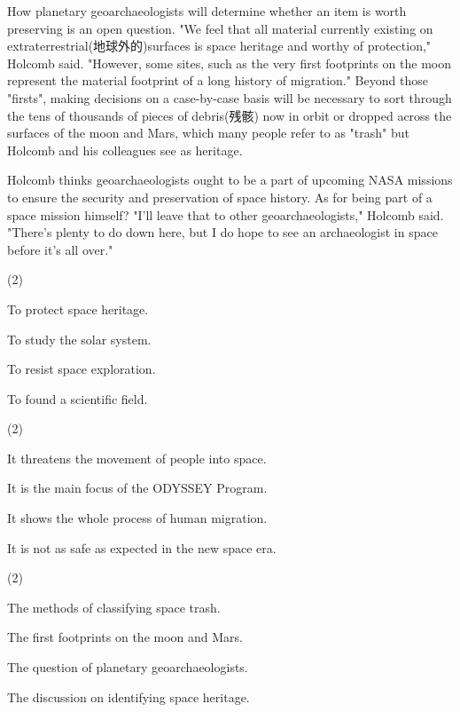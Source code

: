 \documentclass{英语试卷}
\begin{document}
\par How planetary geoarchaeologists will determine whether an item is worth preserving is an open question. "We feel that all material currently existing on extraterrestrial(地球外的)surfaces is space heritage and worthy of protection," Holcomb said. "However, some sites, such as the very first footprints on the moon represent the material footprint of a long history of migration." Beyond those "firsts", making decisions on a case-by-case basis will be necessary to sort through the tens of thousands of pieces of debris(残骸) now in orbit or dropped across the surfaces of the moon and Mars, which many people refer to as "trash" but Holcomb and his colleagues see as heritage.\par
\par Holcomb thinks geoarchaeologists ought to be a part of upcoming NASA missions to ensure the security and preservation of space history. As for being part of a space mission himself? "I'll leave that to other geoarchaeologists," Holcomb said. "There's plenty to do down here, but I do hope to see an archaeologist in space before it's all over."\par
{}
\begin{choices}(2)
  \item To protect space heritage.
  \item To study the solar system.
  \item To resist space exploration.
  \item To found a scientific field.
\end{choices}
\begin{choices}(2)
  \item It threatens the movement of people into space.
  \item It is the main focus of the ODYSSEY Program.
  \item It shows the whole process of human migration.
  \item It is not as safe as expected in the new space era.
\end{choices}
\begin{choices}(2)
  \item The methods of classifying space trash.
  \item The first footprints on the moon and Mars.
  \item The question of planetary geoarchaeologists.
  \item The discussion on identifying space heritage.
\end{choices}
\end{document}
